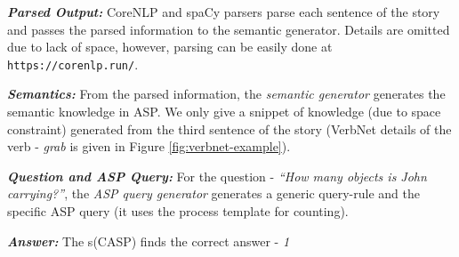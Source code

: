 \documentclass[letterpaper]{article}
\begin{document}
\smallskip
\noindent
\cprotect {}

\smallskip
\noindent \textit{\textbf{Parsed Output: }} CoreNLP and spaCy parsers parse each sentence of the story and passes the parsed information to the semantic generator. Details are omitted due to lack of space, however, parsing can be easily done at \texttt{https://corenlp.run/}.

\noindent \textit{\textbf{Semantics: }}
From the parsed information, the \textit{semantic generator} generates the semantic knowledge in ASP. We only give a snippet of knowledge (due to space constraint) generated from the third sentence of the story (VerbNet details of the verb - \textit{grab} is given in Figure \ref{fig:verbnet-example}).

\smallskip
\noindent
\cprotect {}

\smallskip

\noindent \textit{\textbf{Question and ASP Query: } }
For the question - \textit{``How many objects is John carrying?''}, the\textit{ ASP query generator} generates a generic query-rule and the specific ASP query (it uses the process template for counting).


\smallskip
\noindent
\cprotect {}

\smallskip
\noindent \textit{\textbf{Answer: }} The s(CASP) finds the correct answer - \textit{1}
\end{document}
